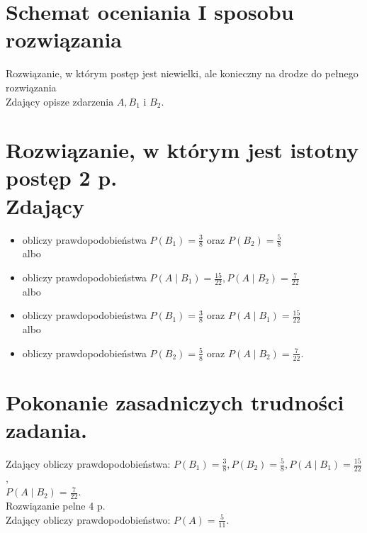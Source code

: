 \documentclass[10pt]{article}
\begin{document}
\section*{Schemat oceniania I sposobu rozwiązania}
Rozwiązanie, w którym postęp jest niewielki, ale konieczny na drodze do pełnego rozwiązania\\
Zdający opisze zdarzenia $A, B_{1}$ i $B_{2}$.

\section*{Rozwiązanie, w którym jest istotny postęp 2 p. \\
 Zdający}
\begin{itemize}
  \item obliczy prawdopodobieństwa $P\left(B_{1}\right)=\frac{3}{8}$ oraz $P\left(B_{2}\right)=\frac{5}{8}$\\
albo
  \item obliczy prawdopodobieństwa $P\left(A \mid B_{1}\right)=\frac{15}{22}, P\left(A \mid B_{2}\right)=\frac{7}{22}$\\
albo
  \item obliczy prawdopodobieństwa $P\left(B_{1}\right)=\frac{3}{8}$ oraz $P\left(A \mid B_{1}\right)=\frac{15}{22}$\\
albo
  \item obliczy prawdopodobieństwa $P\left(B_{2}\right)=\frac{5}{8}$ oraz $P\left(A \mid B_{2}\right)=\frac{7}{22}$.
\end{itemize}

\section*{Pokonanie zasadniczych trudności zadania.}
Zdający obliczy prawdopodobieństwa: $P\left(B_{1}\right)=\frac{3}{8}, P\left(B_{2}\right)=\frac{5}{8}, P\left(A \mid B_{1}\right)=\frac{15}{22}$,\\
$P\left(A \mid B_{2}\right)=\frac{7}{22}$.\\
Rozwiązanie pelne 4 p.\\
Zdający obliczy prawdopodobieństwo: $P(A)=\frac{5}{11}$.
\end{document}
